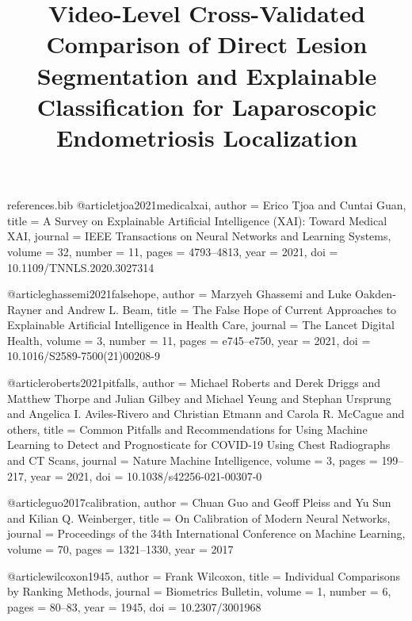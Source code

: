 \begin{filecontents*}{references.bib}
@article{tjoa2021medicalxai,
  author  = {Erico Tjoa and Cuntai Guan},
  title   = {A Survey on Explainable Artificial Intelligence ({XAI}): Toward Medical {XAI}},
  journal = {IEEE Transactions on Neural Networks and Learning Systems},
  volume  = {32},
  number  = {11},
  pages   = {4793--4813},
  year    = {2021},
  doi     = {10.1109/TNNLS.2020.3027314}
}

@article{ghassemi2021falsehope,
  author  = {Marzyeh Ghassemi and Luke Oakden-Rayner and Andrew L. Beam},
  title   = {The False Hope of Current Approaches to Explainable Artificial Intelligence in Health Care},
  journal = {The Lancet Digital Health},
  volume  = {3},
  number  = {11},
  pages   = {e745--e750},
  year    = {2021},
  doi     = {10.1016/S2589-7500(21)00208-9}
}

@article{roberts2021pitfalls,
  author  = {Michael Roberts and Derek Driggs and Matthew Thorpe and Julian Gilbey and Michael Yeung and Stephan Ursprung and Angelica I. Aviles-Rivero and Christian Etmann and Carola R. McCague and others},
  title   = {Common Pitfalls and Recommendations for Using Machine Learning to Detect and Prognosticate for {COVID-19} Using Chest Radiographs and {CT} Scans},
  journal = {Nature Machine Intelligence},
  volume  = {3},
  pages   = {199--217},
  year    = {2021},
  doi     = {10.1038/s42256-021-00307-0}
}

@article{guo2017calibration,
  author  = {Chuan Guo and Geoff Pleiss and Yu Sun and Kilian Q. Weinberger},
  title   = {On Calibration of Modern Neural Networks},
  journal = {Proceedings of the 34th International Conference on Machine Learning},
  volume  = {70},
  pages   = {1321--1330},
  year    = {2017}
}

@article{wilcoxon1945,
  author  = {Frank Wilcoxon},
  title   = {Individual Comparisons by Ranking Methods},
  journal = {Biometrics Bulletin},
  volume  = {1},
  number  = {6},
  pages   = {80--83},
  year    = {1945},
  doi     = {10.2307/3001968}
}
\end{filecontents*}

\documentclass[conference]{IEEEtran}

\usepackage{cite}
\usepackage{amsmath,amssymb}
\usepackage{booktabs}
\usepackage{multirow}
\usepackage{graphicx}
\graphicspath{{figures/}}
\usepackage{array}
\usepackage{xcolor}
\usepackage{url}
\usepackage{enumitem}
\usepackage{placeins}
\usepackage{dblfloatfix}



\title{Video-Level Cross-Validated Comparison of Direct Lesion Segmentation and Explainable Classification for Laparoscopic Endometriosis Localization}

